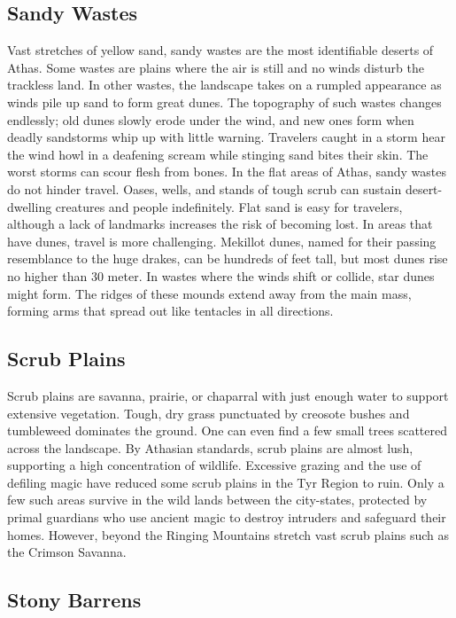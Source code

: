\begin{multicols}{2}
\subsection{Sandy Wastes}

Vast stretches of yellow sand, sandy wastes are the most identifiable deserts
of Athas. Some wastes are plains where the air is still and no winds disturb
the trackless land. In other wastes, the landscape takes on a rumpled appearance
as winds pile up sand to form great dunes. The topography of such wastes
changes endlessly; old dunes slowly erode under the wind, and new ones form
when deadly sandstorms whip up with little warning. Travelers caught in a storm
hear the wind howl in a deafening scream while stinging sand bites their skin.
The worst storms can scour flesh from bones. In the flat areas of Athas, sandy
wastes do not hinder travel. Oases, wells, and stands of tough scrub can
sustain desert-dwelling creatures and people indefinitely. Flat sand is easy
for travelers, although a lack of landmarks increases the risk of becoming
lost. In areas that have dunes, travel is more challenging. Mekillot dunes,
named for their passing resemblance to the huge drakes, can be hundreds of feet
tall, but most dunes rise no higher than 30 meter. In wastes where the winds
shift or collide, star dunes might form. The ridges of these mounds extend away
from the main mass, forming arms that spread out like tentacles in all directions.

\subsection{Scrub Plains}

Scrub plains are savanna, prairie, or chaparral with just enough water to
support extensive vegetation. Tough, dry grass punctuated by creosote bushes
and tumbleweed dominates the ground. One can even find a few small trees
scattered across the landscape. By Athasian standards, scrub plains are almost
lush, supporting a high concentration of wildlife. Excessive grazing and the
use of defiling magic have reduced some scrub plains in the Tyr Region to ruin.
Only a few such areas survive in the wild lands between the city-states,
protected by primal guardians who use ancient magic to destroy intruders and
safeguard their homes. However, beyond the Ringing Mountains stretch vast
scrub plains such as the Crimson Savanna.

\subsection{Stony Barrens}


\end{multicols}
